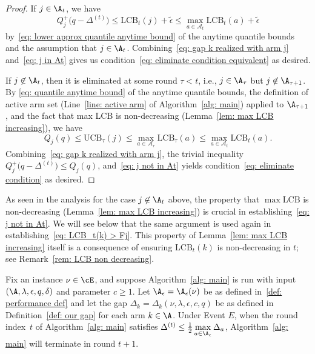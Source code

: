 \begin{proof}
    
    If $j \in \A_t$, we have
    \begin{equation}
    \label{eq: j in At}
        Q^+_{j}\big(q - \Delta^{(t)}\big) 
        \le \mathrm{LCB}_t(j) + \tilde{\epsilon} 
        \le \max\limits_{a \in \mathcal{A}_{t}} \mathrm{LCB}_t(a) + \tilde{\epsilon} 
    \end{equation}
    by~\eqref{eq: lower approx quantile anytime bound} of the anytime quantile bounds and the assumption that $j \in \A_t$. Combining~\eqref{eq: gap k realized with arm j} and~\eqref{eq: j in At} gives us condition~\eqref{eq: eliminate condition equivalent} as desired.
    
    If $j \not\in \A_t$, then it is eliminated at some round $\tau < t$, i.e., 
    $j \in \A_{\tau}$ but $j \not\in \A_{\tau + 1}$.
    By \eqref{eq: quantile anytime bound} of the anytime quantile bounds, the definition of active arm set (Line~\ref{line: active arm} of Algorithm~\ref{alg: main}) applied to $\A_{\tau + 1}$,
    and the fact that max LCB is non-decreasing (Lemma~\ref{lem: max LCB increasing}), 
    we have 
    \begin{equation}
    \label{eq: j not in At}
    Q_{j}(q) 
    \le
    \mathrm{UCB}_{\tau}(j) 
    \le
            \max\limits_{a \in \mathcal{A}_{\tau}} 
            \mathrm{LCB}_{\tau}(a)     
        \le
        \max\limits_{a \in \mathcal{A}_{t}} 
            \mathrm{LCB}_{t}(a). 
    \end{equation}
    Combining~\eqref{eq: gap k realized with arm j}, the trivial inequality 
    $Q^+_{j}\big(q - \Delta^{(t)}\big) 
        \le Q_{j}(q) $, and~\eqref{eq: j not in At} yields
    condition~\eqref{eq: eliminate condition} as desired.
\end{proof}

\begin{remark}
    \label{rem: elim suboptimal}
    As seen in the analysis for the case  $j \not\in \A_t$ above, the property that $\max \mathrm{LCB}$ is non-decreasing (Lemma~\ref{lem: max LCB increasing}) is crucial in establishing~\eqref{eq: j not in At}. We will see below that the same argument is used again in establishing~\eqref{eq: LCB_t(k) > Fj}. This property of Lemma~\ref{lem: max LCB increasing} itself is a consequence of ensuring $\mathrm{LCB}_t(k)$ is non-decreasing in $t$; see Remark~\ref{rem: LCB non decreasing}.
\end{remark}



\begin{lemma}
\label{lem: termination}
     Fix an instance $\nu \in \cE$, and suppose Algorithm~\ref{alg: main} is run with input $(\A, \lambda, \epsilon, q, \delta)$ and parameter $c \ge 1$.
    Let $\A_{\epsilon} = \A_{\epsilon}(\nu) $ be as defined in~\eqref{def: performance def} and let the gap $\Delta_{k} = \Delta_{k}(\nu, \lambda, \epsilon, c, q)$ be as defined in Definition~\ref{def: our gap} 
    for each arm $k \in \A$.
    Under Event $E$, when the round index~$t$
    of Algorithm~\ref{alg: main} satisfies $\Delta^{(t)} \le \frac{1}{2} \max \limits_{a \in \A_{\epsilon}} \Delta_a$, Algorithm~\ref{alg: main} will terminate in round $t+1$.
\end{lemma}

